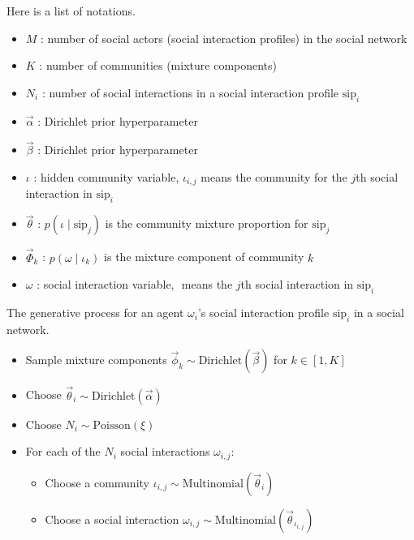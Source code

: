 \documentclass[letterpaper]{article}
\begin{document}
Here is a list of notations.
\begin{itemize}
	\item $ M $ : number of social actors (social interaction profiles) in the social network
	\item $ K $ : number of communities (mixture components)
	\item $ N_{i} $ : number of social interactions in a social interaction profile $ \mbox{sip}_{i} $
	\item $ \vec{\alpha} $ : Dirichlet prior hyperparameter
	\item $ \vec{\beta} $ : Dirichlet prior hyperparameter
	\item $ \iota $ : hidden community variable, $ \iota_{i,j} $ means the community for the $ j $th social interaction in $ \mbox{sip}_{i} $
	\item $ \vec{\theta} $ : $ p(\iota \mid \mbox{sip}_{j}) $ is the community mixture proportion for $ \mbox{sip}_{j} $ 
	\item $ \vec{\Phi}_{k} $ : $ p(\omega \mid \iota_{k} ) $ is the mixture component of community $ k $
	\item $ \omega $ : social interaction variable, $ $ means the $ j $th social interaction in $ \mbox{sip}_{i} $
\end{itemize}

The generative process for an agent $ \omega_{i} $'s social interaction profile $ \mbox{sip}_{i} $ in a social network.
\begin{itemize}
	\item Sample mixture components $ \vec{\phi}_{k} \sim \mbox{Dirichlet}(\vec{\beta}) $ for $ k \in [1, K] $
	\item Choose $ \vec{\theta}_{i} \sim \mbox{Dirichlet}(\vec{\alpha}) $ 
	\item Choose $ N_{i}  \sim \mbox{Poisson}(\xi) $
	\item For each of the $ N_{i} $ social interactions $ \omega_{i,j} $:
	\begin{itemize}
		\item Choose a community $ \iota_{i,j} \sim \mbox{Multinomial}( \vec{\theta}_{i} ) $
		\item Choose a social interaction $ \omega_{i,j} \sim \mbox{Multinomial}( \vec{\theta}_{\iota_{i,j}} ) $	
	\end{itemize}
\end{itemize}
\end{document}
